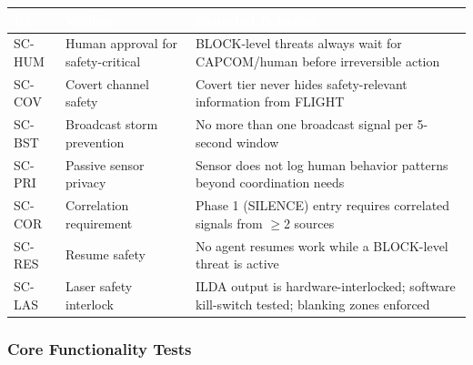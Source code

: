 \documentclass[11pt,letterpaper]{article}
\newcommand{\tableheader}[1]{\textbf{\sffamily\textcolor{white}{#1}}}
\begin{document}
\begin{center}
\begin{tabularx}{\textwidth}{C{1.2cm}L{3.5cm}X}
\toprule
{}
\tableheader{ID} & \tableheader{Verifies} & \tableheader{Expected Behavior} \\
\midrule
SC-HUM & Human approval for safety-critical & BLOCK-level threats always wait for CAPCOM/human before irreversible action \\
SC-COV & Covert channel safety & Covert tier never hides safety-relevant information from FLIGHT \\
SC-BST & Broadcast storm prevention & No more than one broadcast signal per 5-second window \\
SC-PRI & Passive sensor privacy & Sensor does not log human behavior patterns beyond coordination needs \\
SC-COR & Correlation requirement & Phase 1 (SILENCE) entry requires correlated signals from $\geq$2 sources \\
SC-RES & Resume safety & No agent resumes work while a BLOCK-level threat is active \\
SC-LAS & Laser safety interlock & ILDA output is hardware-interlocked; software kill-switch tested; blanking zones enforced \\
\bottomrule
\end{tabularx}
\end{center}

\subsubsection{Core Functionality Tests}
\end{document}

